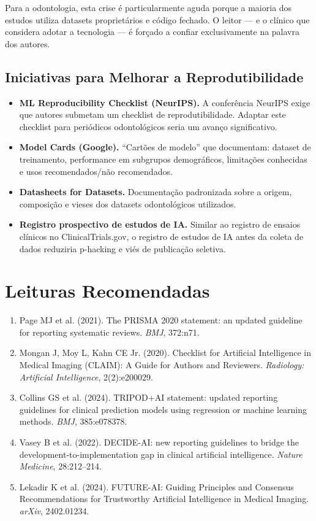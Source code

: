 Para a odontologia, esta crise é particularmente aguda porque a maioria dos estudos utiliza datasets proprietários e código fechado. O leitor — e o clínico que considera adotar a tecnologia — é forçado a confiar exclusivamente na palavra dos autores.

\subsection{Iniciativas para Melhorar a Reprodutibilidade}

\begin{itemize}
    \item \textbf{ML Reproducibility Checklist (NeurIPS).} A conferência NeurIPS exige que autores submetam um checklist de reprodutibilidade. Adaptar este checklist para periódicos odontológicos seria um avanço significativo.
    \item \textbf{Model Cards (Google).} ``Cartões de modelo'' que documentam: dataset de treinamento, performance em subgrupos demográficos, limitações conhecidas e usos recomendados/não recomendados.
    \item \textbf{Datasheets for Datasets.} Documentação padronizada sobre a origem, composição e vieses dos datasets odontológicos utilizados.
    \item \textbf{Registro prospectivo de estudos de IA.} Similar ao registro de ensaios clínicos no ClinicalTrials.gov, o registro de estudos de IA antes da coleta de dados reduziria p-hacking e viés de publicação seletiva.
\end{itemize}

\section{Leituras Recomendadas}
\begin{enumerate}
    \item Page MJ et al. (2021). The PRISMA 2020 statement: an updated guideline for reporting systematic reviews. \textit{BMJ}, 372:n71.
    \item Mongan J, Moy L, Kahn CE Jr. (2020). Checklist for Artificial Intelligence in Medical Imaging (CLAIM): A Guide for Authors and Reviewers. \textit{Radiology: Artificial Intelligence}, 2(2):e200029.
    \item Collins GS et al. (2024). TRIPOD+AI statement: updated reporting guidelines for clinical prediction models using regression or machine learning methods. \textit{BMJ}, 385:e078378.
    \item Vasey B et al. (2022). DECIDE-AI: new reporting guidelines to bridge the development-to-implementation gap in clinical artificial intelligence. \textit{Nature Medicine}, 28:212--214.
    \item Lekadir K et al. (2024). FUTURE-AI: Guiding Principles and Consensus Recommendations for Trustworthy Artificial Intelligence in Medical Imaging. \textit{arXiv}, 2402.01234.
\end{enumerate}

